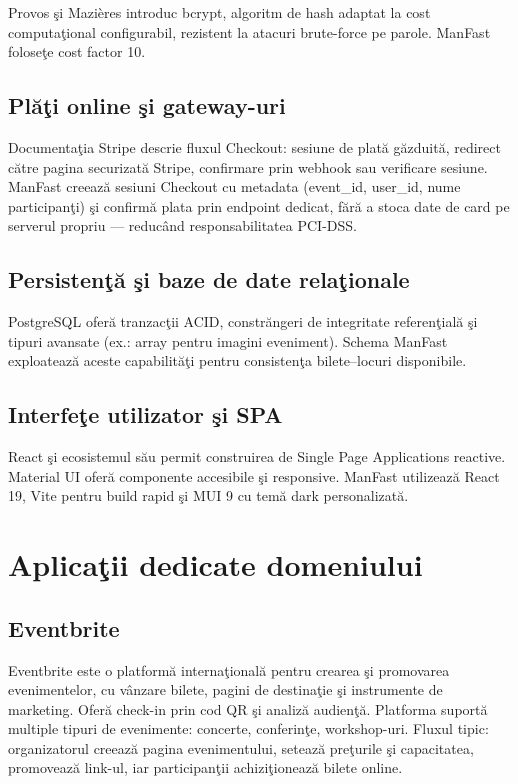 Provos \c si Mazi\`eres \cite{bcrypt1999} introduc bcrypt, algoritm de hash adaptat la cost computa\c tional configurabil, rezistent la atacuri brute-force pe parole. ManFast folose\c te cost factor 10.

\subsection{Pl\u a\c ti online \c si gateway-uri}

Documenta\c tia Stripe \cite{stripe2024} descrie fluxul Checkout: sesiune de plat\u a g\u azduit\u a, redirect c\u atre pagina securizat\u a Stripe, confirmare prin webhook sau verificare sesiune. ManFast creeaz\u a sesiuni Checkout cu metadata (event\_id, user\_id, nume participan\c ti) \c si confirm\u a plata prin endpoint dedicat, f\u ar\u a a stoca date de card pe serverul propriu --- reduc\^and responsabilitatea PCI-DSS.

\subsection{Persisten\c t\u a \c si baze de date rela\c tionale}

PostgreSQL \cite{postgresql2024} ofer\u a tranzac\c tii ACID, constr\u angeri de integritate referen\c tial\u a \c si tipuri avansate (ex.: array pentru imagini eveniment). Schema ManFast exploateaz\u a aceste capabilit\u a\c ti pentru consisten\c ta bilete--locuri disponibile.

\subsection{Interfe\c te utilizator \c si SPA}

React \cite{react2024} \c si ecosistemul s\u au permit construirea de Single Page Applications reactive. Material UI \cite{mui2024} ofer\u a componente accesibile \c si responsive. ManFast utilizeaz\u a React 19, Vite pentru build rapid \c si MUI 9 cu tem\u a dark personalizat\u a.

\section{Aplica\c tii dedicate domeniului}

\subsection{Eventbrite}

Eventbrite \cite{eventbrite2024} este o platform\u a interna\c tional\u a pentru crearea \c si promovarea evenimentelor, cu v\^anzare bilete, pagini de destina\c tie \c si instrumente de marketing. Ofer\u a check-in prin cod QR \c si analiz\u a audien\c t\u a. Platforma suport\u a multiple tipuri de evenimente: concerte, conferin\c te, workshop-uri. Fluxul tipic: organizatorul creeaz\u a pagina evenimentului, seteaz\u a pre\c turile \c si capacitatea, promoveaz\u a link-ul, iar participan\c tii achizi\c tioneaz\u a bilete online.

